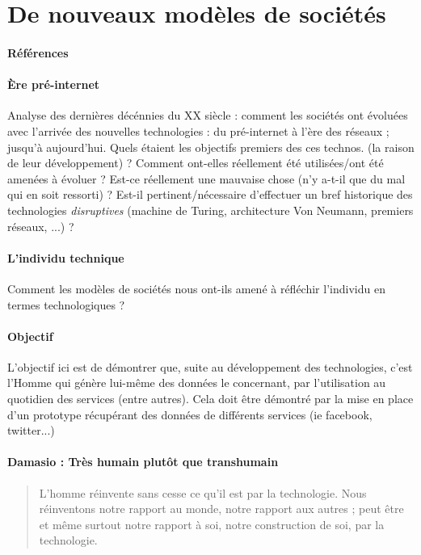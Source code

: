 \section{De nouveaux modèles de sociétés}
\paragraph{Références} \cite{Marx0} \cite{Marx1} \cite{Nietzsche0}

\paragraph{Ère pré-internet} Analyse des dernières décénnies du XX siècle :
comment les sociétés ont évoluées avec l'arrivée des nouvelles technologies : du
pré-internet à l'ère des réseaux ; jusqu'à aujourd'hui. Quels étaient les objectifs
premiers des ces technos. (la raison de leur développement) ? Comment ont-elles réellement
été utilisées/ont été amenées à évoluer ? Est-ce réellement une mauvaise chose (n'y
a-t-il que du mal qui en soit ressorti) ? Est-il pertinent/nécessaire d'effectuer un bref
historique des technologies \emph{disruptives} (machine de Turing, architecture
Von Neumann, premiers réseaux, ...) ?

\paragraph{L'individu technique} Comment les modèles de sociétés nous ont-ils amené à
réfléchir l'individu en termes technologiques ?

\paragraph{Objectif} L'objectif ici est de démontrer que, suite au développement des technologies, c'est l'Homme
qui génère lui-même des données le concernant, par l'utilisation au quotidien des services (entre autres).
Cela doit être démontré par la mise en place d'un prototype récupérant des données de différents
services (ie facebook, twitter...)

\paragraph{Damasio : Très humain plutôt que transhumain}

\begin{quotation}
    L'homme réinvente sans cesse ce qu'il est par la technologie. Nous réinventons notre
    rapport au monde, notre rapport aux autres ; peut être et même surtout notre rapport à soi, 
    notre construction de soi, par la technologie. \cite{Damasio2}
\end{quotation}

